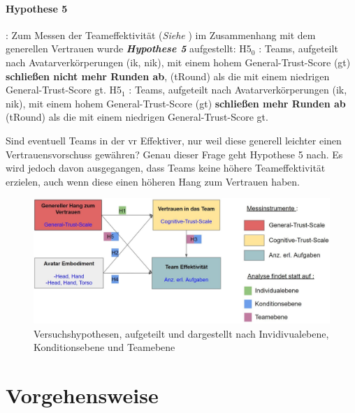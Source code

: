 \documentclass[a4paper,11pt]{article}%
\renewcommand{\\}{\vspace*{0.5\baselineskip} \newline}
\begin{document}
\paragraph{Hypothese 5}:
Zum Messen der Teameffektivität (\textit{Siehe }) im Zusammenhang mit dem generellen Vertrauen wurde \textbf{\textit{Hypothese 5}} aufgestellt:\\
	H5$_{0}$ : Teams, aufgeteilt nach Avatarverkörperungen (\ac{ik}, \ac{nik}), mit einem hohem General-Trust-Score (\ac{gt}) \textbf{schließen nicht mehr Runden ab}, (\ac{tRound}) als die mit einem niedrigen General-Trust-Score \ac{gt}.\newline
	H5$_{1}$ :  Teams, aufgeteilt nach Avatarverkörperungen (\ac{ik}, \ac{nik}), mit einem hohem General-Trust-Score (\ac{gt}) \textbf{schließen mehr Runden ab} (\ac{tRound}) als die mit einem niedrigen General-Trust-Score \ac{gt}.

Sind eventuell Teams in der \ac{vr} Effektiver, nur weil diese generell leichter einen Vertrauensvorschuss gewähren? Genau dieser Frage geht Hypothese 5 nach. Es wird jedoch davon ausgegangen, dass Teams keine höhere Teameffektivität erzielen, auch wenn diese einen höheren Hang zum Vertrauen haben.

\begin{figure}[H]
		\begin{footnotesize}
			\includegraphics[width=\textwidth]{Abbildungen/Versuchshypothesen_02.JPG}
			
			\caption{Versuchshypothesen, aufgeteilt und dargestellt nach Invidivualebene, Konditionsebene und Teamebene}
			\label{Versuchshypothesen}
		\end{footnotesize}
	\end{figure}	

\newpage

\section{Vorgehensweise}
\end{document}

